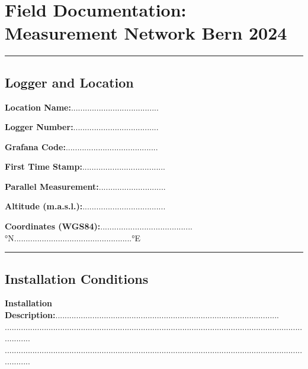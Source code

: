 
\section*{Field Documentation: Measurement Network Bern 2024}
\vspace{-5mm}
\rule{\linewidth}{0.1mm}

\vspace{-5mm}
\subsection*{Logger and Location}

\begin{multicols}{2}
\textbf{Location Name:}......................................\hfill \newline

\textbf{Logger Number:}..................................... \hfill \newline

\textbf{Grafana Code:}........................................ \hfill \newline

\textbf{First Time Stamp:}....................................\hfill \newline

\textbf{Parallel Measurement:}.............................\hfill \newline

\textbf{Altitude (m.a.s.l.):}....................................\hfill \newline
\end{multicols}

\vspace{-4mm}
\textbf{Coordinates (WGS84):}........................................°N...................................................°E

\rule{\linewidth}{0.1mm}


\vspace{-5mm}
\subsection*{Installation Conditions}
\textbf{Installation Description:}.................................................................................................\\
............................................................................................................................................\\
............................................................................................................................................

